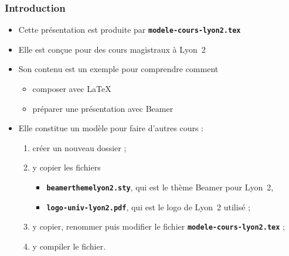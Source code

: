 \documentclass[10pt,t]{beamer}
\begin{document}
\begin{frame}%
  \frametitle{Introduction}


  \begin{itemize}
  \item Cette présentation est produite par \texttt{\textbf{modele-cours-lyon2.tex}}
  \item Elle est conçue pour des cours magistraux à Lyon~2
  \item Son contenu est un exemple pour comprendre comment

    \begin{itemize}
    \item composer avec \LaTeX{}
    \item préparer une présentation avec Beamer
    \end{itemize}

  \end{itemize}

  \pause


  \begin{itemize}
  \item Elle constitue un modèle pour faire d'autres cours :
    
    \begin{enumerate}
    \item créer un nouveau dossier ;
    \item y copier les fichiers 
      
      \begin{itemize}
      \item \texttt{\textbf{beamerthemelyon2.sty}}, qui est le thème Beamer pour Lyon~2,
      \item \texttt{\textbf{logo-univ-lyon2.pdf}}, qui est le logo de Lyon~2 utilisé ;
      \end{itemize}
      
    \item y copier, renommer puis modifier le fichier \texttt{\textbf{modele-cours-lyon2.tex}} ;
    \item y compiler le fichier.
    \end{enumerate}
  \end{itemize}

  \pause

\end{frame}
\end{document}
